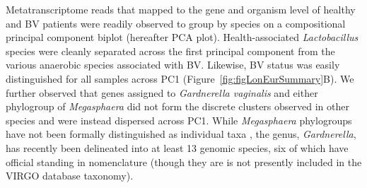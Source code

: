 \documentclass[sn-mathphys,Numbered]{sn-jnl}%
\begin{document}
Metatranscriptome reads that mapped to the gene and organism level of healthy and BV patients were readily observed to group by species on a compositional principal component biplot \cite{aitchison2002biplots} (hereafter PCA plot). Health-associated \textit{Lactobacillus} species were cleanly separated across the first principal component from the various anaerobic species associated with BV. Likewise, BV status was easily distinguished for all samples across PC1 (Figure~\ref{fig:figLonEurSummary}B). We further observed that genes assigned to \textit{Gardnerella vaginalis} and either phylogroup of \textit{Megasphaera} did not form the discrete clusters observed in other species and were instead dispersed across PC1. While \textit{Megasphaera} phylogroups have not been formally distinguished as individual taxa \citep{glascock_unique_2021}, the genus, \textit{Gardnerella}, has recently been delineated into at least 13 genomic species, six of which have official standing in nomenclature \citep{vaneechoutte_emended_2019, sousa_gardSpp_2023} (though they are is not presently included in the VIRGO database taxonomy).
\end{document}
